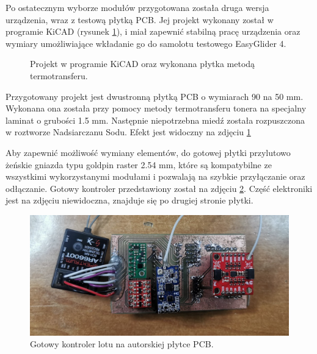 \documentclass[12pt, a4paper]{article}
\begin{document}
Po ostatecznym wyborze modułów przygotowana została druga wersja urządzenia, wraz  z testową płytką PCB. Jej projekt wykonany został w programie KiCAD (rysunek \ref{fig:stara}), i miał zapewnić stabilną pracę urządzenia oraz wymiary umożliwiające wkładanie go do samolotu testowego EasyGlider 4. 

\begin{figure}[ht]
    \centering
    \qquad
    \caption{Projekt w programie KiCAD oraz wykonana płytka metodą termotransferu.}
    \label{fig:stara}
\end{figure}

Przygotowany projekt jest dwustronną płytką PCB o wymiarach 90 na 50 mm. Wykonana ona została przy pomocy metody termotransferu tonera na specjalny laminat o grubości 1.5 mm. Następnie niepotrzebna miedź została rozpuszczona w roztworze Nadsiarczanu Sodu. Efekt jest widoczny na zdjęciu \ref{fig:stara}

Aby zapewnić możliwość wymiany elementów, do gotowej płytki przylutowo żeńskie gniazda typu goldpin raster 2.54 mm, które są kompatybilne ze wszystkimi wykorzystanymi modułami i pozwalają na szybkie przyłączanie oraz odłączanie. Gotowy kontroler przedstawiony został na zdjęciu \ref{fig:starycaly}. Część elektroniki jest na zdjęciu niewidoczna, znajduje się po drugiej stronie płytki.

\begin{figure}[ht]
    \centering
    \includegraphics[width=1\textwidth]{kontorolerstary}
    \caption{Gotowy kontroler lotu na autorskiej płytce PCB.}
    \label{fig:starycaly}
\end{figure}
\end{document}
